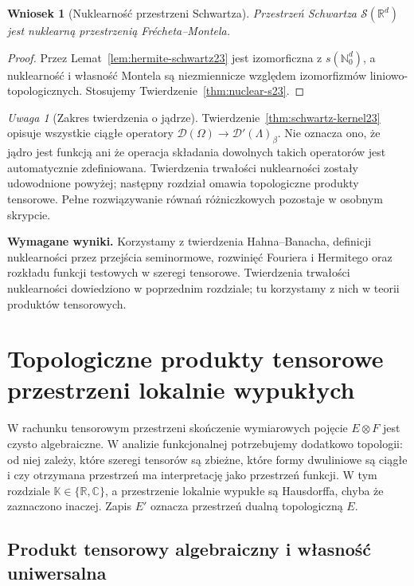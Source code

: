 \documentclass[11pt,a4paper]{article}
\numberwithin{equation}{section}
\theoremstyle{plain}
\newtheorem{wniosek}[twierdzenie]{Wniosek}
\theoremstyle{definition}
\theoremstyle{remark}
\newtheorem{uwaga}[twierdzenie]{Uwaga}
\newcommand{\R}{\mathbb R}
\newcommand{\C}{\mathbb C}
\newcommand{\N}{\mathbb N}
\newcommand{\K}{\mathbb K}
\begin{document}
\begin{wniosek}[Nuklearność przestrzeni Schwartza]
\label{cor:nuclear-schwartz23}
Przestrzeń Schwartza $\mathcal S(\R^d)$ jest nuklearną
przestrzenią Frécheta--Montela.
\end{wniosek}
\begin{proof}
Przez Lemat~\ref{lem:hermite-schwartz23} jest izomorficzna
z $s(\N_0^d)$, a nuklearność i własność Montela są
niezmiennicze względem izomorfizmów liniowo-topologicznych.
Stosujemy Twierdzenie~\ref{thm:nuclear-s23}.
\end{proof}

\begin{uwaga}[Zakres twierdzenia o jądrze]
\label{rem:kernel-scope23}
Twierdzenie~\ref{thm:schwartz-kernel23} opisuje wszystkie
ciągłe operatory $\mathcal D(\Omega)\to\mathcal D'(\Lambda)_\beta$.
Nie oznacza ono, że jądro jest funkcją ani że operacja
składania dowolnych takich operatorów jest automatycznie
zdefiniowana. Twierdzenia trwałości nuklearności zostały udowodnione
powyżej; następny rozdział omawia topologiczne produkty tensorowe. Pełne rozwiązywanie równań
różniczkowych pozostaje w osobnym skrypcie.
\end{uwaga}


\setcounter{section}{23}
\noindent\textbf{Wymagane wyniki.} Korzystamy z twierdzenia Hahna--Banacha, definicji nuklearności przez przejścia seminormowe, rozwinięć Fouriera i Hermitego oraz rozkładu funkcji testowych w szeregi tensorowe. Twierdzenia trwałości nuklearności dowiedziono w poprzednim rozdziale; tu korzystamy z nich w teorii produktów tensorowych.
\medskip
\section{Topologiczne produkty tensorowe przestrzeni lokalnie wypukłych}
\label{sec:tensor24}

W rachunku tensorowym przestrzeni skończenie wymiarowych pojęcie
$E\otimes F$ jest czysto algebraiczne. W analizie funkcjonalnej
potrzebujemy dodatkowo topologii: od niej zależy, które szeregi
tensorów są zbieżne, które formy dwuliniowe są ciągłe i czy
otrzymana przestrzeń ma interpretację jako przestrzeń funkcji.
W tym rozdziale $\K\in\{\R,\C\}$, a przestrzenie lokalnie wypukłe
są Hausdorffa, chyba że zaznaczono inaczej. Zapis $E'$ oznacza
przestrzeń dualną topologiczną $E$.

\subsection{Produkt tensorowy algebraiczny i własność uniwersalna}
\end{document}
